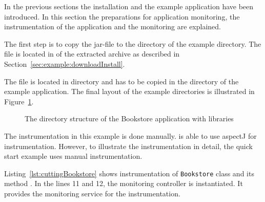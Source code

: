 In the previous sections the \Kieker{} installation and the example application have been introduced. In this section the preparations for application monitoring, the instrumentation of the application and the monitoring are explained.

The first step is to copy the \Kieker{} jar-file \file{\mainJar} to the  directory of the example directory. The file is located in  of the extracted \Kieker{} archive as described in Section~\ref{sec:example:downloadInstall}.

The file \file{\commonsLoggingJar} is located in  directory and has to be copied in the  directory of the example application. The final layout of the example directories is illustrated in Figure~\ref{fig:KiekerBookstoreExample}.

\begin{figure}[H]
\begin{graybox}
\end{graybox}
\caption{The directory structure of the Bookstore application with \Kieker{} libraries}
\label{fig:KiekerBookstoreExample}
\end{figure}

\noindent The instrumentation in this example is done manually. \Kieker{} is able to use aspectJ for instrumentation. However, to illustrate the instrumentation in detail, the quick start example uses manual instrumentation.

Listing~\ref{lst:cuttingBookstore} shows instrumentation of \verb!Bookstore! class and its method . In the lines 11 and 12, the monitoring controller is instantiated. It provides the monitoring service for the instrumentation.


